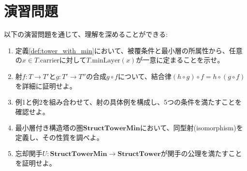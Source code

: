 \documentclass[a4paper,12pt]{article}
\theoremstyle{definition}
\begin{document}
\section{演習問題}

以下の演習問題を通じて、理解を深めることができる:

\begin{enumerate}
\item 定義\ref{def:tower_with_min}において、被覆条件と最小層の所属性から、任意の$x \in T.\text{carrier}$に対して$T.\text{minLayer}(x)$が一意に定まることを示せ。

\item 射$f : T \to T'$と$g : T' \to T''$の合成$g \circ f$について、結合律$(h \circ g) \circ f = h \circ (g \circ f)$を詳細に証明せよ。

\item 例1と例2を組み合わせて、射の具体例を構成し、5つの条件を満たすことを確認せよ。

\item 最小層付き構造塔の圏$\mathbf{StructTowerMin}$において、同型射(isomorphism)を定義し、その性質を調べよ。

\item 忘却関手$U : \mathbf{StructTowerMin} \to \mathbf{StructTower}$が関手の公理を満たすことを証明せよ。
\end{enumerate}
\end{document}
